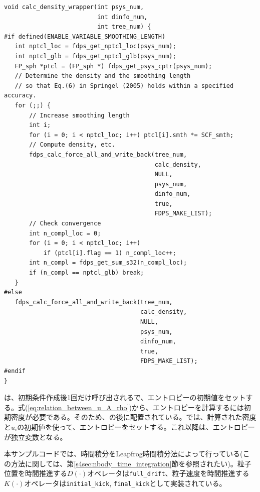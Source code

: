 \begin{lstlisting}[caption=\procedure \texttt{calc\_density\_wrapper}の実装]
void calc_density_wrapper(int psys_num,
                          int dinfo_num,
                          int tree_num) {
#if defined(ENABLE_VARIABLE_SMOOTHING_LENGTH)
   int nptcl_loc = fdps_get_nptcl_loc(psys_num);
   int nptcl_glb = fdps_get_nptcl_glb(psys_num);
   FP_sph *ptcl = (FP_sph *) fdps_get_psys_cptr(psys_num);
   // Determine the density and the smoothing length
   // so that Eq.(6) in Springel (2005) holds within a specified accuracy.
   for (;;) {
       // Increase smoothing length 
       int i;
       for (i = 0; i < nptcl_loc; i++) ptcl[i].smth *= SCF_smth;
       // Compute density, etc.
       fdps_calc_force_all_and_write_back(tree_num,
                                          calc_density,
                                          NULL,
                                          psys_num,
                                          dinfo_num,
                                          true,
                                          FDPS_MAKE_LIST);
       // Check convergence
       int n_compl_loc = 0;
       for (i = 0; i < nptcl_loc; i++)
           if (ptcl[i].flag == 1) n_compl_loc++;
       int n_compl = fdps_get_sum_s32(n_compl_loc);
       if (n_compl == nptcl_glb) break;
   }
#else
   fdps_calc_force_all_and_write_back(tree_num,
                                      calc_density,
                                      NULL,
                                      psys_num,
                                      dinfo_num,
                                      true,
                                      FDPS_MAKE_LIST);
#endif
}
\end{lstlisting}
\endifC

\procedure {}は、初期条件作成後1回だけ呼び出される\procedure で、エントロピーの初期値をセットする。式(\ref{eq:relation_between_u_A_rho})から、エントロピーを計算するには初期密度が必要である。そのため、\procedure {}の後に配置されている。\procedure {}では、計算された密度と$u_{i}$の初期値を使って、エントロピーをセットする。これ以降は、エントロピーが独立変数となる。


本サンプルコードでは、時間積分をLeapfrog時間積分法によって行っている(この方法に関しては、第\ref{s4sec:nbody_time_integration}節を参照されたい)。粒子位置を時間推進する$D(\cdot)$オペレータは\procedure \texttt{full\_drift}、粒子速度を時間推進する$K(\cdot)$オペレータは\procedure \texttt{initial\_kick}, \texttt{final\_kick}として実装されている。

